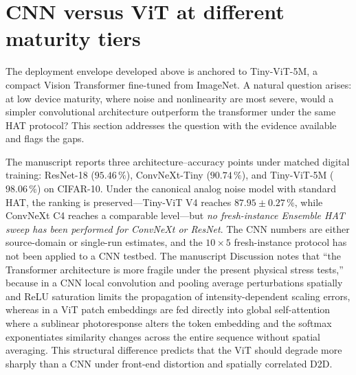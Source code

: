 \section{CNN versus ViT at different maturity tiers}
\label{sec:cnn-vs-vit-tiers}

The deployment envelope developed above is anchored to Tiny-ViT-5M, a compact Vision Transformer fine-tuned from ImageNet.  A natural question arises: at low device maturity, where noise and nonlinearity are most severe, would a simpler convolutional architecture outperform the transformer under the same HAT protocol?  This section addresses the question with the evidence available and flags the gaps.

The manuscript reports three architecture--accuracy points under matched digital training: ResNet-18 ($95.46\,\%$), ConvNeXt-Tiny ($90.74\,\%$), and Tiny-ViT-5M ($98.06\,\%$) on CIFAR-10.  Under the canonical analog noise model with standard HAT, the ranking is preserved---Tiny-ViT V4 reaches $87.95\pm0.27\,\%$, while ConvNeXt C4 reaches a comparable level---but \emph{no fresh-instance Ensemble HAT sweep has been performed for ConvNeXt or ResNet}.  The CNN numbers are either source-domain or single-run estimates, and the $10 \times 5$ fresh-instance protocol has not been applied to a CNN testbed.  The manuscript Discussion notes that ``the Transformer architecture is more fragile under the present physical stress tests,'' because in a CNN local convolution and pooling average perturbations spatially and ReLU saturation limits the propagation of intensity-dependent scaling errors, whereas in a ViT patch embeddings are fed directly into global self-attention where a sublinear photoresponse alters the token embedding and the softmax exponentiates similarity changes across the entire sequence without spatial averaging.  This structural difference predicts that the ViT should degrade more sharply than a CNN under front-end distortion and spatially correlated D2D.

